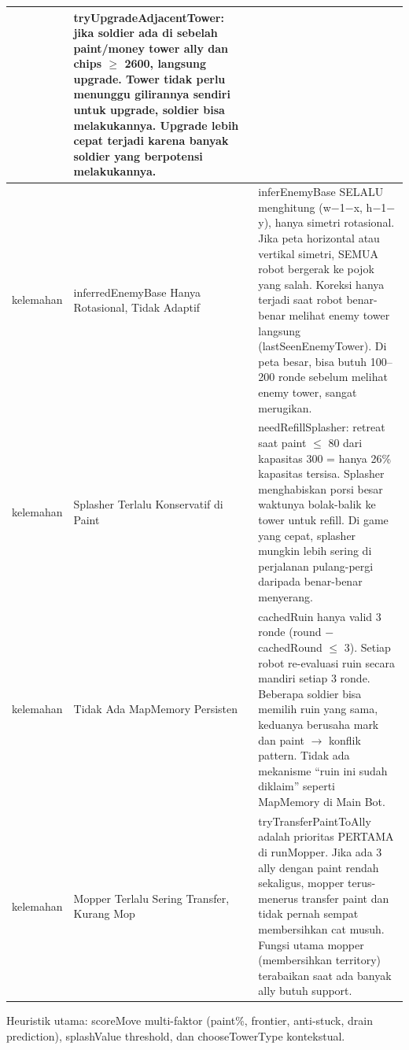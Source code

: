 \documentclass{article}
\begin{document}
\begin{enumerate}[label=\alph*.]
\begin{longtable}{|p{2cm}|p{3.5cm}|p{8.5cm}|}
& tryUpgradeAdjacentTower: jika soldier ada di sebelah paint/money tower ally dan chips $\geq$ 2600, langsung upgrade.
Tower tidak perlu menunggu gilirannya sendiri untuk upgrade, soldier bisa melakukannya.
Upgrade lebih cepat terjadi karena banyak soldier yang berpotensi melakukannya. \\
\hline
kelemahan
& inferredEnemyBase Hanya Rotasional, Tidak Adaptif
& inferEnemyBase SELALU menghitung (w$-$1$-$x, h$-$1$-$y), hanya simetri rotasional.
Jika peta horizontal atau vertikal simetri, SEMUA robot bergerak ke pojok yang salah.
Koreksi hanya terjadi saat robot benar-benar melihat enemy tower langsung (lastSeenEnemyTower).
Di peta besar, bisa butuh 100--200 ronde sebelum melihat enemy tower, sangat merugikan. \\
\hline
kelemahan
& Splasher Terlalu Konservatif di Paint
& needRefillSplasher: retreat saat paint $\leq$ 80 dari kapasitas 300 = hanya 26\% kapasitas tersisa.
Splasher menghabiskan porsi besar waktunya bolak-balik ke tower untuk refill.
Di game yang cepat, splasher mungkin lebih sering di perjalanan pulang-pergi daripada benar-benar menyerang. \\
\hline
kelemahan
& Tidak Ada MapMemory Persisten
& cachedRuin hanya valid 3 ronde (round $-$ cachedRound $\leq$ 3).
Setiap robot re-evaluasi ruin secara mandiri setiap 3 ronde.
Beberapa soldier bisa memilih ruin yang sama, keduanya berusaha mark dan paint $\rightarrow$ konflik pattern.
Tidak ada mekanisme ``ruin ini sudah diklaim'' seperti MapMemory di Main Bot. \\
\hline
kelemahan
& Mopper Terlalu Sering Transfer, Kurang Mop
& tryTransferPaintToAlly adalah prioritas PERTAMA di runMopper.
Jika ada 3 ally dengan paint rendah sekaligus, mopper terus-menerus transfer paint dan tidak pernah sempat membersihkan cat musuh.
Fungsi utama mopper (membersihkan territory) terabaikan saat ada banyak ally butuh support. \\
\hline
\end{longtable}


Heuristik utama: scoreMove multi-faktor (paint\%, frontier, anti-stuck, drain prediction),
splashValue threshold, dan chooseTowerType kontekstual.


\end{enumerate}
\end{document}
